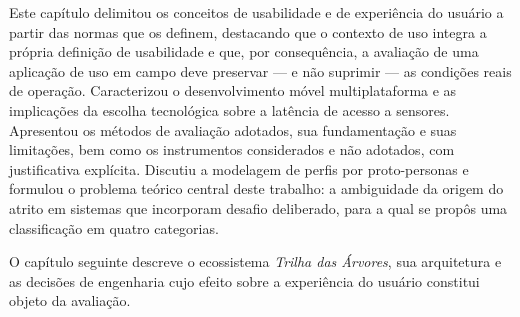 Este capítulo delimitou os conceitos de usabilidade e de experiência do usuário a
partir das normas que os definem, destacando que o contexto de uso integra a
própria definição de usabilidade e que, por consequência, a avaliação de uma
aplicação de uso em campo deve preservar --- e não suprimir --- as condições
reais de operação. Caracterizou o desenvolvimento móvel multiplataforma e as
implicações da escolha tecnológica sobre a latência de acesso a sensores.
Apresentou os métodos de avaliação adotados, sua fundamentação e suas limitações,
bem como os instrumentos considerados e não adotados, com justificativa explícita.
Discutiu a modelagem de perfis por proto-personas e formulou o problema teórico
central deste trabalho: a ambiguidade da origem do atrito em sistemas que
incorporam desafio deliberado, para a qual se propôs uma classificação em quatro
categorias.

O capítulo seguinte descreve o ecossistema \textit{Trilha das Árvores}, sua
arquitetura e as decisões de engenharia cujo efeito sobre a experiência do usuário
constitui objeto da avaliação.
